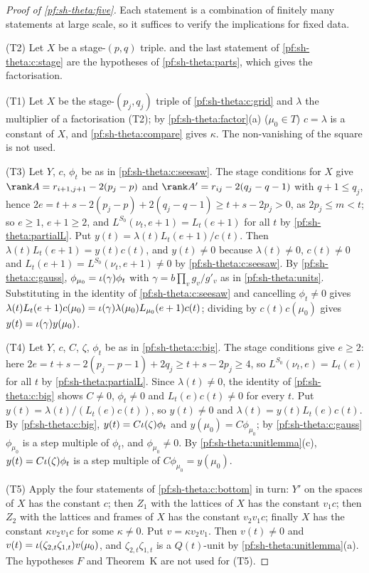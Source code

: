 \begin{proof}[Proof of \cref{pf:sh-theta:five}]
Each statement is a combination of finitely many statements at large scale, so it suffices to verify the implications for
fixed data.

(T2) Let $X$ be a stage-$(p,q)$ triple.  and the last statement of \ref{pf:sh-theta:c:stage} are the
hypotheses of \cref{pf:sh-theta:parts}, which gives the factorisation.

(T1) Let $X$ be the stage-$(p_j,q_j)$ triple of \ref{pf:sh-theta:c:grid} and $\lambda$ the multiplier of a factorisation
(T2); by \cref{pf:sh-theta:factor}(a) ($\mu_0\in T$) $c=\lambda$ is a constant of $X$, and \cref{pf:sh-theta:compare} gives
$\kappa$. The non-vanishing of the square is not used.

(T3) Let $Y$, $c$, $\phi_t$ be as in \ref{pf:sh-theta:c:seesaw}. The stage conditions for $X$ give
$\rank A=r_{i+1,j+1}-2(p_j-p)$ and $\rank A'=r_{ij}-2(q_j-q-1)$ with $q+1\le q_j$, hence
$2e=t+s-2(p_j-p)+2(q_j-q-1)\ge t+s-2p_j>0$, as $2p_j\le m<t$; so $e\ge1$, $e+1\ge2$, and
$L^{S_0}(\nu_t,e+1)=L_t(e+1)$ for all $t$ by \cref{pf:sh-theta:partialL}. Put $y(t)=\lambda(t)L_t(e+1)/c(t)$. Then
$\lambda(t)L_t(e+1)=y(t)c(t)$, and $y(t)\ne0$ because $\lambda(t)\ne0$, $c(t)\ne0$ and $L_t(e+1)=L^{S_0}(\nu_t,e+1)\ne0$ by
\ref{pf:sh-theta:c:seesaw}. By
\ref{pf:sh-theta:c:gauss}, $\phi_{\mu_0}=\iota(\gamma)\phi_t$ with $\gamma=b\prod_vg_v/g'_v$ as in
\cref{pf:sh-theta:units}. Substituting in the identity of \ref{pf:sh-theta:c:seesaw} and cancelling $\phi_t\ne0$ gives
$\lambda(t)L_t(e+1)c(\mu_0)=\iota(\gamma)\lambda(\mu_0)L_{\mu_0}(e+1)c(t)$; dividing by $c(t)c(\mu_0)$ gives
$y(t)=\iota(\gamma)y(\mu_0)$.

(T4) Let $Y$, $c$, $C$, $\zeta$, $\phi_t$ be as in \ref{pf:sh-theta:c:big}. The stage conditions give $e\ge2$: here
$2e=t+s-2(p_j-p-1)+2q_j\ge t+s-2p_j\ge4$, so $L^{S_0}(\nu_t,e)=L_t(e)$ for all
$t$ by \cref{pf:sh-theta:partialL}. Since $\lambda(t)\ne0$, the identity of \ref{pf:sh-theta:c:big} shows $C\ne0$,
$\phi_t\ne0$ and $L_t(e)c(t)\ne0$ for every $t$. Put $y(t)=\lambda(t)/(L_t(e)c(t))$, so $y(t)\ne0$ and
$\lambda(t)=y(t)L_t(e)c(t)$. By \ref{pf:sh-theta:c:big}, $y(t)=C\iota(\zeta)\phi_t$ and $y(\mu_0)=C\phi_{\mu_0}$; by
\ref{pf:sh-theta:c:gauss} $\phi_{\mu_0}$ is a step multiple of $\phi_t$, and $\phi_{\mu_0}\ne0$. By
\cref{pf:sh-theta:unitlemma}(c), $y(t)=C\iota(\zeta)\phi_t$ is a step multiple of $C\phi_{\mu_0}=y(\mu_0)$.

(T5) Apply the four statements of \ref{pf:sh-theta:c:bottom} in turn: $Y'$ on the spaces of $X$ has the constant $c$; then
$Z_1$ with the lattices of $X$ has the constant $v_1c$; then $Z_2$ with the lattices and frames of $X$ has the constant
$v_2v_1c$; finally $X$ has the constant $\kappa v_2v_1c$ for some $\kappa\ne0$. Put $v=\kappa v_2v_1$. Then $v(t)\ne0$ and
$v(t)=\iota(\zeta_{2,t}\zeta_{1,t})v(\mu_0)$, and $\zeta_{2,t}\zeta_{1,t}$ is a $Q(t)$-unit by
\cref{pf:sh-theta:unitlemma}(a). The hypotheses $F$ and Theorem~K are not used for (T5).
\end{proof}

